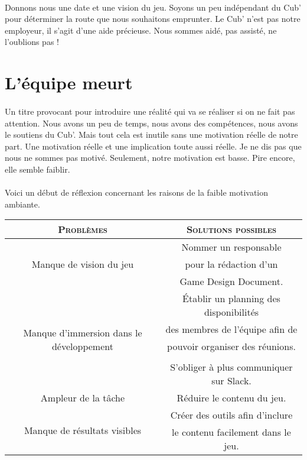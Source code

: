 \documentclass{report}
\begin{document}
\paragraph{}
\label{independanceCub}
Donnons nous une date et une vision du jeu. Soyons un peu indépendant du Cub' pour déterminer la route que nous souhaitons emprunter.
Le Cub' n'est pas notre employeur, il s'agit d'une aide précieuse. Nous sommes aidé, pas assisté, ne l'oublions pas !

\section{L'équipe meurt}

\paragraph{}
Un titre provocant pour introduire une réalité qui va se réaliser si on ne fait pas attention. Nous avons un peu de temps, nous avons des compétences, nous avons le soutiens du Cub'. Mais tout cela est inutile sans une motivation réelle de notre part. Une motivation réelle et une implication toute aussi réelle. Je ne dis pas que nous ne sommes pas motivé. Seulement, notre motivation est basse. Pire encore, elle semble faiblir.

\paragraph{}
Voici un début de réflexion concernant les raisons de la faible motivation ambiante.

\begin{center}
  \begin{tabular}{c | c}
    \textsc{Problèmes} & \textsc{Solutions possibles} \\
    \hline
    
    \multirow{3}{*}{Manque de vision du jeu} &  Nommer un responsable   \\
    & pour la rédaction d'un \\
    & Game Design Document.\\
    
    \hline
    
    \multirow{5}{*}{Manque d'immersion dans le développement} &  Établir un planning des disponibilités\\
    & des membres de l'équipe afin de\\
    & pouvoir organiser des réunions.\\
    & \\
    & S'obliger à plus communiquer sur Slack.\\

    \hline
    Ampleur de la tâche & Réduire le contenu du jeu.\\
    \hline
    \multirow{2}{*}{Manque de résultats visibles} & Créer des outils afin d'inclure\\
    & le contenu facilement dans le jeu.\\
  \end{tabular}
\end{center}
\end{document}

